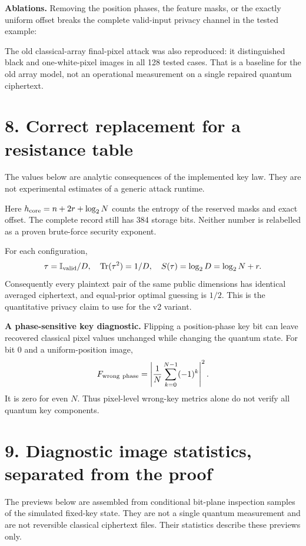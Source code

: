 \documentclass[11pt,a4paper]{article}
\newcommand{\tr}{\operatorname{Tr}}\newcommand{\xor}{\mathbin{\oplus}}
\begin{document}


\textbf{Ablations.} Removing the position phases, the feature masks, or the exactly uniform offset breaks the complete valid-input privacy channel in the tested example:


The old classical-array final-pixel attack was also reproduced: it distinguished black and one-white-pixel images in all 128 tested cases. That is a baseline for the old array model, not an operational measurement on a single repaired quantum ciphertext.

\newpage
\section*{8. Correct replacement for a resistance table}
The values below are analytic consequences of the implemented key law. They are not experimental estimates of a generic attack runtime.



Here \(h_{\rm core}=n+2r+\log_2N\) counts the entropy of the reserved masks and exact offset. The complete record still has 384 storage bits. Neither number is relabelled as a proven brute-force security exponent.

For each configuration,
\[
\tau=\Id_{\rm valid}/D,\quad
\tr(\tau^2)=1/D,\quad
S(\tau)=\log_2D=\log_2N+r.
\]
Consequently every plaintext pair of the same public dimensions has identical averaged ciphertext, and equal-prior optimal guessing is \(1/2\). This is the quantitative privacy claim to use for the v2 variant.

\textbf{A phase-sensitive key diagnostic.} Flipping a position-phase key bit can leave recovered classical pixel values unchanged while changing the quantum state. For bit 0 and a uniform-position image,
\[
F_{\rm wrong\ phase}
=\left|\frac1N\sum_{k=0}^{N-1}(-1)^k\right|^2.
\]
It is zero for even \(N\). Thus pixel-level wrong-key metrics alone do not verify all quantum key components.


\newpage
\section*{9. Diagnostic image statistics, separated from the proof}
The previews below are assembled from conditional bit-plane inspection samples of the simulated fixed-key state. They are not a single quantum measurement and are not reversible classical ciphertext files. Their statistics describe these previews only.
\end{document}
